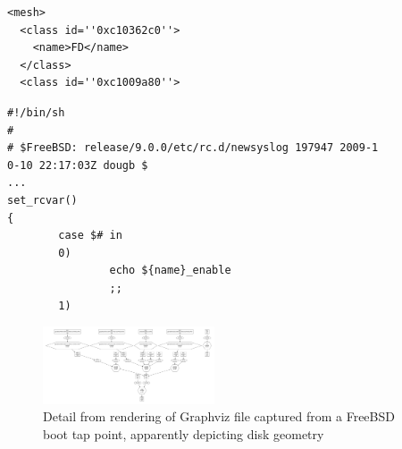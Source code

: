 \begin{verbatim}
<mesh>
  <class id=''0xc10362c0''>
    <name>FD</name>
  </class>
  <class id=''0xc1009a80''>
\end{verbatim}

\begin{verbatim}
#!/bin/sh
#
# $FreeBSD: release/9.0.0/etc/rc.d/newsyslog 197947 2009-1
0-10 22:17:03Z dougb $
...
set_rcvar()
{
        case $# in
        0)
                echo ${name}_enable
                ;;
        1)
\end{verbatim}


\begin{figure}[t]
    \begin{center}
        \includegraphics[width=2in]{figures/freebsd_graphviz.pdf}
    \end{center}
    \caption{Detail from rendering of Graphviz file captured from a FreeBSD
boot tap point, apparently depicting disk geometry}
    \label{fig:graphviz}
\end{figure}




